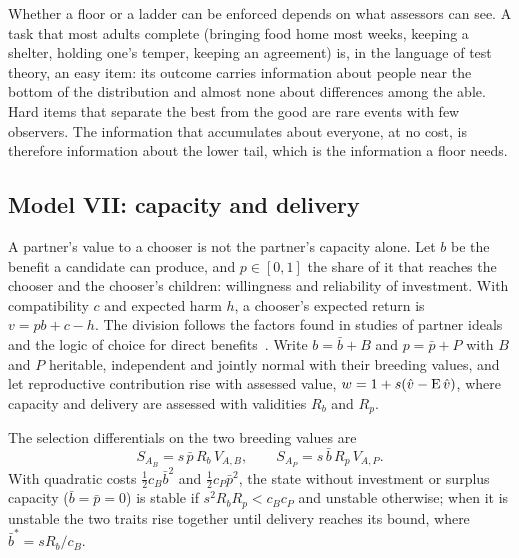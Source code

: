 \begin{remark}
Whether a floor or a ladder can be enforced depends on what assessors can see. A task that most adults complete (bringing food
home most weeks, keeping a shelter, holding one's temper, keeping an agreement) is, in the language of test theory, an easy
item: its outcome carries information about people near the bottom of the distribution and almost none about differences among
the able. Hard items that separate the best from the good are rare events with few observers. The information that
accumulates about everyone, at no cost, is therefore information about the lower tail, which is the information a floor needs.
\end{remark}

\subsection{Model VII: capacity and delivery}\label{sec:delivery}

A partner's value to a chooser is not the partner's capacity alone. Let $b$ be the benefit a candidate can produce, and
$p\in[0,1]$ the share of it that reaches the chooser and the chooser's children: willingness and reliability of investment.
With compatibility $c$ and expected harm $h$, a chooser's expected return is $v=pb+c-h$. The division follows the factors found
in studies of partner ideals~\cite{fletcher1999} and the logic of choice for direct benefits~\cite{hoelzer1989}. Write
$b=\bar b+B$ and $p=\bar p+P$ with $B$ and $P$ heritable, independent and jointly normal with their breeding values, and let
reproductive contribution rise with assessed value, $w=1+s(\hat v-\operatorname{E}\hat v)$, where capacity and delivery are assessed with
validities $R_b$ and $R_p$.

\begin{proposition}\label{prop:delivery}
The selection differentials on the two breeding values are
\begin{equation}
S_{A_B}=s\,\bar p\,R_b\,V_{A,B},\qquad S_{A_P}=s\,\bar b\,R_p\,V_{A,P}.\label{eq:delivery}
\end{equation}
With quadratic costs $\tfrac12c_B\bar b^2$ and $\tfrac12c_P\bar p^2$, the state without investment or surplus capacity
($\bar b=\bar p=0$) is stable if $s^2R_bR_p<c_Bc_P$ and unstable otherwise; when it is unstable the two traits rise together
until delivery reaches its bound, where $\bar b^*=sR_b/c_B$.
\end{proposition}

